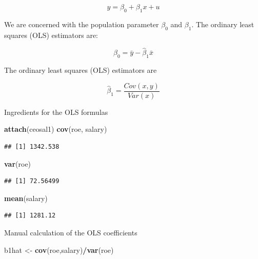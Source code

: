 \documentclass[]{book}
\newenvironment{Shaded}{\begin{snugshade}}{\end{snugshade}}
\newcommand{\KeywordTok}[1]{\textcolor[rgb]{0.13,0.29,0.53}{\textbf{#1}}}
\newcommand{\NormalTok}[1]{#1}
\newcommand{\OperatorTok}[1]{\textcolor[rgb]{0.81,0.36,0.00}{\textbf{#1}}}
\newcommand{\StringTok}[1]{\textcolor[rgb]{0.31,0.60,0.02}{#1}}
\begin{document}
\begin{equation}
y = \beta_{0} + \beta_{1}x + u
\label{eq:simplelinearregressionmodel}
\end{equation}

We are concerned with the population parameter \(\beta_{0}\) and
\(\beta_{1}\). The ordinary least squares (OLS) estimators are:

\begin{equation}
\hat{\beta}_{0} = \bar{y} - \hat{\beta}_{1}\bar{x}
\label{eq:populationparameterBeta0}
\end{equation}

The ordinary least squares (OLS) estimators are

\begin{equation}
\hat{\beta}_{1} = \frac{Cov(x,y)}{Var(x)}
\label{eq:populationparameterBeta1}
\end{equation}

Ingredients for the OLS formulas

\begin{Shaded}
\begin{Highlighting}[]
\KeywordTok{attach}\NormalTok{(ceosal1)}
\KeywordTok{cov}\NormalTok{(roe, salary)}
\end{Highlighting}
\end{Shaded}

\begin{verbatim}
## [1] 1342.538
\end{verbatim}

\begin{Shaded}
\begin{Highlighting}[]
\KeywordTok{var}\NormalTok{(roe)}
\end{Highlighting}
\end{Shaded}

\begin{verbatim}
## [1] 72.56499
\end{verbatim}

\begin{Shaded}
\begin{Highlighting}[]
\KeywordTok{mean}\NormalTok{(salary)}
\end{Highlighting}
\end{Shaded}

\begin{verbatim}
## [1] 1281.12
\end{verbatim}

Manual calculation of the OLS coefficients

\begin{Shaded}
\begin{Highlighting}[]
\NormalTok{b1hat <-}\StringTok{ }\KeywordTok{cov}\NormalTok{(roe,salary)}\OperatorTok{/}\KeywordTok{var}\NormalTok{(roe)}
\end{Highlighting}
\end{Shaded}
\end{document}
